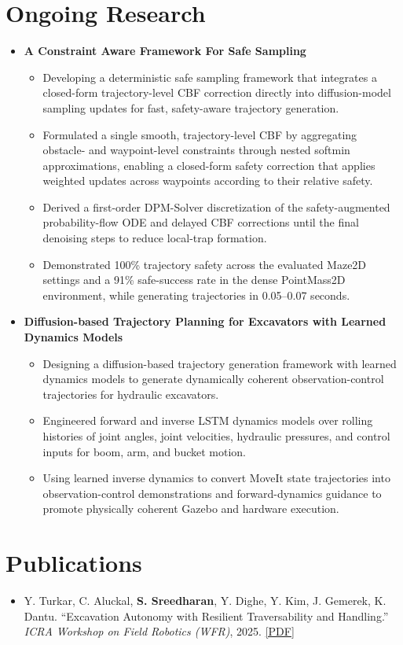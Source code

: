 \documentclass[letterpaper,10.5pt]{article}
\newcommand{\projectheading}[2]{%
  \vspace{2pt}%
  {\bfseries #1} \hfill #2%
  \vspace{-4pt}%
}
\newcommand{\resumeItemListStart}{%
  \begin{itemize}[leftmargin=0.2in, itemsep=-1pt, topsep=2pt, label={--}]\small%
}
\newcommand{\resumeItemListEnd}{\end{itemize}\vspace{-2pt}}
\newcommand{\resumeItem}[1]{\item #1}
\newcommand{\sectionliststart}{\begin{itemize}[leftmargin=0in, label={}, itemsep=2pt]}
\newcommand{\sectionlistend}{\end{itemize}}
\begin{document}
\section{Ongoing Research}
\sectionliststart
  \item
    \projectheading{A Constraint Aware Framework For Safe Sampling}
    \resumeItemListStart
      \resumeItem{Developing a deterministic safe sampling framework that integrates a closed-form trajectory-level CBF correction directly into diffusion-model sampling updates for fast, safety-aware trajectory generation.}
      \resumeItem{Formulated a single smooth, trajectory-level CBF by aggregating obstacle- and waypoint-level constraints through nested softmin approximations, enabling a closed-form safety correction that applies weighted updates across waypoints according to their relative safety. }
      \resumeItem{Derived a first-order DPM-Solver discretization of the safety-augmented probability-flow ODE and delayed CBF corrections until the final denoising steps to reduce local-trap formation.}
      \resumeItem{Demonstrated 100\% trajectory safety across the evaluated Maze2D settings and a 91\% safe-success rate in the dense PointMass2D environment, while generating trajectories in 0.05–0.07 seconds.}
    \resumeItemListEnd

  \item
    \projectheading{Diffusion-based Trajectory Planning for Excavators with Learned Dynamics Models}
    \resumeItemListStart
      \resumeItem{Designing a diffusion-based trajectory generation framework with learned dynamics models to generate dynamically coherent observation-control trajectories for hydraulic excavators.}
      \resumeItem{Engineered forward and inverse LSTM dynamics models over rolling histories of joint angles, joint velocities, hydraulic pressures, and control inputs for boom, arm, and bucket motion.}
      \resumeItem{Using learned inverse dynamics to convert MoveIt state trajectories into observation-control demonstrations and forward-dynamics guidance to promote physically coherent Gazebo and hardware execution.}
    \resumeItemListEnd
\sectionlistend

\section{Publications}
\sectionliststart
  \item\small{
    Y. Turkar, C. Aluckal, \textbf{S. Sreedharan}, Y. Dighe, Y. Kim, J. Gemerek, K. Dantu.
    ``Excavation Autonomy with Resilient Traversability and Handling.''
    \textit{ICRA Workshop on Field Robotics (WFR)}, 2025.
    \href{https://droneslab.github.io/EARTH/static/docs/EARTH_WFR_Optimized.pdf}{[PDF]}
  }
\sectionlistend
\end{document}
